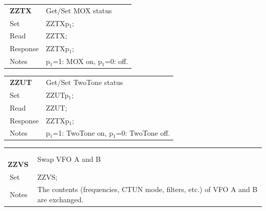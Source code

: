 \documentclass[12pt]{book}
\begin{document}
\begin{center}
\begin{tabular}{|p{2cm}|p{11cm}|}
\toprule
$\phantom{\Big|}$\textbf{\large ZZTX} & Get/Set MOX status \\\cline{1-2}
$\phantom{\Big|}${\large Set} & {ZZTXp$_1$;} \\\hline
$\phantom{\Big|}${\large Read} & {ZZTX;} \\\hline
$\phantom{\Big|}${\large Response} & {ZZTXp$_1$;} \\\hline
$\phantom{\Big|}${\large Notes} & \multicolumn{1}{|p{11cm}|}{p$_1$=1: MOX on, p$_1$=0: off.} \\
\bottomrule
\end{tabular}
\end{center}

\begin{center}
\begin{tabular}{|p{2cm}|p{11cm}|}
\toprule
$\phantom{\Big|}$\textbf{\large ZZUT} & Get/Set TwoTone status \\\cline{1-2}
$\phantom{\Big|}${\large Set} & {ZZUTp$_1$;} \\\hline
$\phantom{\Big|}${\large Read} & {ZZUT;} \\\hline
$\phantom{\Big|}${\large Response} & {ZZTXp$_1$;} \\\hline
$\phantom{\Big|}${\large Notes} & \multicolumn{1}{|p{11cm}|}{p$_1$=1: TwoTone on, p$_1$=0: TwoTone off.} \\
\bottomrule
\end{tabular}
\end{center}

\begin{center}
\begin{tabular}{|p{2cm}|p{11cm}|}
\toprule
$\phantom{\Big|}$\textbf{\large ZZVS} & Swap VFO A and B \\\cline{1-2}
$\phantom{\Big|}${\large Set} & {ZZVS;} \\\hline
$\phantom{\Big|}${\large Notes} & \multicolumn{1}{|p{11cm}|}{The contents (frequencies, CTUN mode, filters, etc.) of VFO A and B are exchanged.} \\
\bottomrule
\end{tabular}
\end{center}
\end{document}
